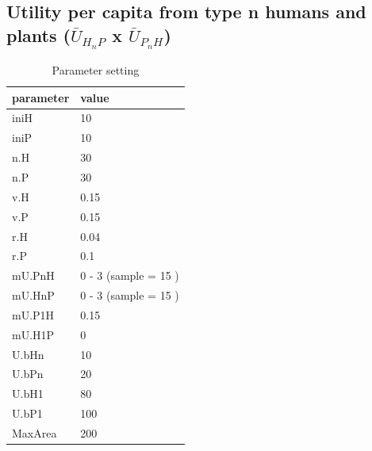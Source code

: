 \documentclass[
]{book}
\begin{document}
\hypertarget{utility-per-capita-from-type-n-humans-and-plants-baru_h_np-x-baru_p_nh}{%
\subsection{\texorpdfstring{Utility per capita from type n humans and plants (\(\bar{U}_{H_{n}P}\) x \(\bar{U}_{P_{n}H}\))}{Utility per capita from type n humans and plants (\textbackslash bar\{U\}\_\{H\_\{n\}P\} x \textbackslash bar\{U\}\_\{P\_\{n\}H\})}}\label{utility-per-capita-from-type-n-humans-and-plants-baru_h_np-x-baru_p_nh}}


\begin{table}[!h]

\caption{\label{tab:3mUHnPmUPnHtablepdf}Parameter setting}
\centering
\begin{tabular}[t]{l|l}
\hline
parameter & value\\
\hline
iniH & 10\\
\hline
iniP & 10\\
\hline
n.H & 30\\
\hline
n.P & 30\\
\hline
v.H & 0.15\\
\hline
v.P & 0.15\\
\hline
r.H & 0.04\\
\hline
r.P & 0.1\\
\hline
mU.PnH & 0 - 3 (sample = 15 )\\
\hline
mU.HnP & 0 - 3 (sample = 15 )\\
\hline
mU.P1H & 0.15\\
\hline
mU.H1P & 0\\
\hline
U.bHn & 10\\
\hline
U.bPn & 20\\
\hline
U.bH1 & 80\\
\hline
U.bP1 & 100\\
\hline
MaxArea & 200\\
\hline
\end{tabular}
\end{table}

\newpage
\end{document}

